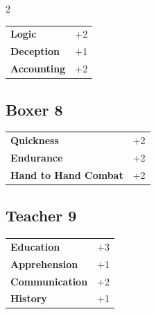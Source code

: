 \begin{multicols}{2}
\begin{tcolorbox}
\begin{tabular}{@{}ll@{}}
    \textbf{Logic} & +2\\
    \textbf{Deception} & +1\\
    \textbf{Accounting} & +2\\
\end{tabular}


\end{tcolorbox}

\begin{tcolorbox}
    \subsection*{Boxer \hfill \small{8 }}
    \tcblower




\begin{tabular}{@{}ll@{}}
    \textbf{Quickness} & +2\\
    \textbf{Endurance} & +2\\
    \textbf{Hand to Hand Combat} & +2\\
\end{tabular}


\end{tcolorbox}

\begin{tcolorbox}
    \subsection*{Teacher \hfill \small{9 }}
    \tcblower




\begin{tabular}{@{}ll@{}}
    \textbf{Education} & +3\\
    \textbf{Apprehension} & +1\\
    \textbf{Communication} & +2\\
    \textbf{History} & +1\\
\end{tabular}


\end{tcolorbox}
\end{multicols}
